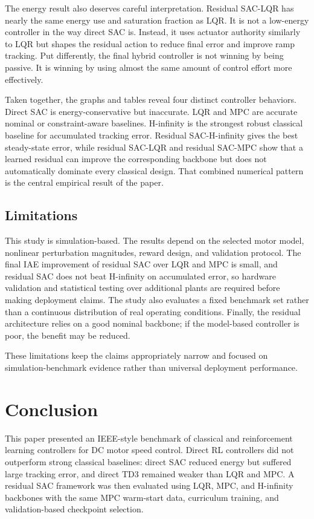 \documentclass[conference]{IEEEtran}
\begin{document}
The energy result also deserves careful interpretation. Residual SAC-LQR has nearly the same energy use and saturation fraction as LQR. It is not a low-energy controller in the way direct SAC is. Instead, it uses actuator authority similarly to LQR but shapes the residual action to reduce final error and improve ramp tracking. Put differently, the final hybrid controller is not winning by being passive. It is winning by using almost the same amount of control effort more effectively.

Taken together, the graphs and tables reveal four distinct controller behaviors. Direct SAC is energy-conservative but inaccurate. LQR and MPC are accurate nominal or constraint-aware baselines. H-infinity is the strongest robust classical baseline for accumulated tracking error. Residual SAC-H-infinity gives the best steady-state error, while residual SAC-LQR and residual SAC-MPC show that a learned residual can improve the corresponding backbone but does not automatically dominate every classical design. That combined numerical pattern is the central empirical result of the paper.

\subsection{Limitations}
This study is simulation-based. The results depend on the selected motor model, nonlinear perturbation magnitudes, reward design, and validation protocol. The final IAE improvement of residual SAC over LQR and MPC is small, and residual SAC does not beat H-infinity on accumulated error, so hardware validation and statistical testing over additional plants are required before making deployment claims. The study also evaluates a fixed benchmark set rather than a continuous distribution of real operating conditions. Finally, the residual architecture relies on a good nominal backbone; if the model-based controller is poor, the benefit may be reduced.

These limitations keep the claims appropriately narrow and focused on simulation-benchmark evidence rather than universal deployment performance.

\section{Conclusion}
This paper presented an IEEE-style benchmark of classical and reinforcement learning controllers for DC motor speed control. Direct RL controllers did not outperform strong classical baselines: direct SAC reduced energy but suffered large tracking error, and direct TD3 remained weaker than LQR and MPC. A residual SAC framework was then evaluated using LQR, MPC, and H-infinity backbones with the same MPC warm-start data, curriculum training, and validation-based checkpoint selection.
\end{document}
